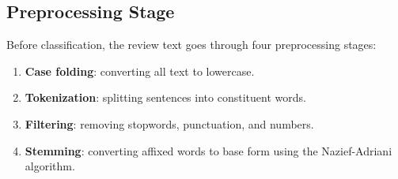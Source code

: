 \subsection{Preprocessing Stage}

Before classification, the review text goes through four preprocessing stages:

\begin{enumerate}
  \item \textbf{Case folding}: converting all text to lowercase.
  \item \textbf{Tokenization}: splitting sentences into constituent words.
  \item \textbf{Filtering}: removing stopwords, punctuation, and numbers.
  \item \textbf{Stemming}: converting affixed words to base form using the Nazief-Adriani algorithm.
\end{enumerate}

